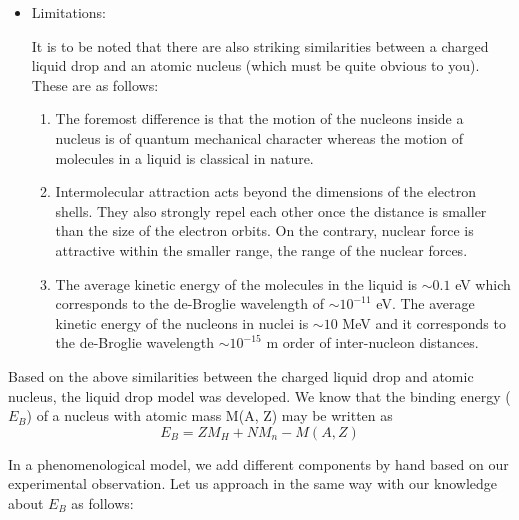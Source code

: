 \documentclass[ebook,12pt,oneside,openany]{memoir}
\begin{document}
\begin{itemize}
        \item Limitations:
            \par It is to be noted that there are also striking similarities between a charged liquid drop and an atomic nucleus (which must be quite obvious to you). These are as follows:
        
            \begin{enumerate}
                \item The foremost difference is that the motion of the nucleons inside a nucleus is of quantum mechanical character whereas the motion of molecules in a liquid is classical in nature.
                \item Intermolecular attraction acts beyond the dimensions of the electron shells. They also strongly repel each other once the distance is smaller than the size of the electron orbits. On the contrary, nuclear force is attractive within the smaller range, the range of the nuclear forces.
                \item The average kinetic energy of the molecules in the liquid is $\sim0.1$ eV which corresponds to the de-Broglie wavelength of $\sim10^{-11}$ eV. The average kinetic energy of the nucleons in nuclei is $\sim10$ MeV and it corresponds to the de-Broglie wavelength $\sim10^{-15}$ m order of inter-nucleon distances.
            \end{enumerate}
    \end{itemize} 
    
Based on the above similarities between the charged liquid drop and atomic nucleus, the liquid drop model was developed. We know that the binding energy ($E_B$) of a nucleus with atomic mass M(A, Z) may be written as
    \begin{equation}
    E_B = ZM_H + NM_n - M(A, Z)
    \end{equation} 
\par In a phenomenological model, we add different components by hand based on our experimental observation. Let us approach in the same way with our knowledge about $E_B$ as follows:
\end{document}
